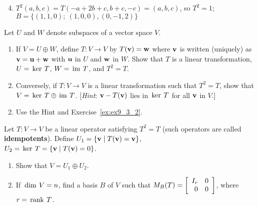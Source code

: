 \begin{multicols}{2}
\begin{ex}
\begin{sol}
\begin{enumerate}[label={\alph*.}]
\setcounter{enumi}{3}
\item $T^{2}(a, b, c) = T(-a + 2b + c, b + c, -c) = (a, b, c)$, so $T^{2} = 1$; $B = \{(1, 1, 0);\ (1, 0, 0), (0, -1, 2)\}$

\end{enumerate}
\end{sol}
\end{ex}

\begin{ex}\label{ex:ex9_3_23}
Let $U$ and $W$ denote subspaces of a vector space $V$.


\begin{enumerate}[label={\alph*.}]
\item If $V = U \oplus W$, define $T : V \to V$ by $T(\textbf{v}) = \textbf{w}$ where $\textbf{v}$ is written (uniquely) as $\textbf{v} = \textbf{u} + \textbf{w}$ with $\textbf{u}$ in $U$ and $\textbf{w}$ in $W$. Show that $T$ is a linear transformation, $U = \thinspace\operatorname{ker \medspace}T$, $W = \thinspace\operatorname{im \medspace}T$, and $T^{2} = T$.

\item Conversely, if $T : V \to V$ is a linear transformation such that $T^{2} = T$, show that $V = \thinspace\operatorname{ker \medspace}T \oplus \thinspace\operatorname{im \medspace}T$. [\textit{Hint}: $\textbf{v} - T(\textbf{v})$ lies in $\thinspace\operatorname{ker \medspace}T$ for all $\textbf{v}$ in $V$.]

\end{enumerate}
\begin{sol}
\begin{enumerate}[label={\alph*.}]
\setcounter{enumi}{1}
\item Use the Hint and Exercise~\ref{ex:ex9_3_2}.

\end{enumerate}
\end{sol}
\end{ex}

\begin{ex}
Let $T : V \to V$ be a linear operator satisfying $T^{2} = T$ (such operators are called \textbf{idempotents}). Define $U_{1} = \{\textbf{v} \mid T(\textbf{v}) = \textbf{v}\}$, \\$U_{2} = \thinspace\operatorname{ker \medspace}T = \{\textbf{v} \mid T(\textbf{v}) = 0\}$.


\begin{enumerate}[label={\alph*.}]
\item Show that $V = U_{1} \oplus U_{2}$.

\item If $\thinspace\operatorname{dim \medspace}V = n$, find a basis $B$ of $V$ such that $M_B(T) = \left[ \begin{array}{rr} I_r & 0 \\ 0 & 0 \end{array} \right]$, where $r = \thinspace\operatorname{rank \medspace}T$.


\end{enumerate}
\end{ex}
\end{multicols}
